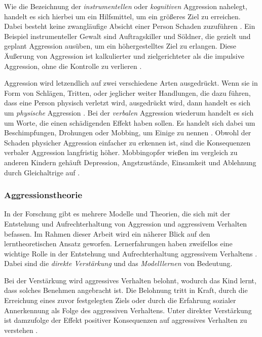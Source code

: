Wie die Bezeichnung der \textit{instrumentellen} oder \textit{kognitiven} Aggression nahelegt, handelt es sich hierbei um ein Hilfsmittel, um ein größeres Ziel zu erreichen. Dabei besteht keine zwangläufige Absicht einer Person Schaden zuzuführen \parencite{instrumental_aggro, instrumental_dictionary}.
Ein Beispiel instrumenteller Gewalt sind Auftragskiller und Söldner, die gezielt und geplant Aggression ausüben, um ein höhergestelltes Ziel zu erlangen. Diese Äußerung von Aggression ist kalkulierter und zielgerichteter als die impulsive Aggression, ohne die Kontrolle zu verlieren \parencite{impulsive_instrumental_aggro_healtline}.

Aggression wird letzendlich auf zwei verschiedene Arten ausgedrückt. Wenn sie in Form von Schlägen, Tritten, oder jeglicher weiter Handlungen, die dazu führen, dass eine Person physisch verletzt wird, ausgedrückt wird, dann handelt es sich um \textit{physische} Aggression \parencite{impulsive_instrumental_aggro_healtline, physische_verbale_aggro, physische_verbale_aggro_2}. Bei der \textit{verbalen} Aggression wiederum handelt es sich um Worte, die einen schädigenden Effekt haben sollen. Es handelt sich dabei um Beschimpfungen, Drohungen oder Mobbing, um Einige zu nennen \parencite{physische_verbale_aggro, physische_verbale_aggro_2, impulsive_instrumental_aggro_healtline}. Obwohl der Schaden physicher Aggression einfacher zu erkennen ist, sind die Konsequenzen verbaler Aggression langfristig höher. Mobbingopfer wießen im vergleich zu anderen Kindern gehäuft Depression, Angstzustände, Einsamkeit und Ablehnung durch Gleichaltrige auf \parencite{ausmaß_verbale_aggro}.



\subsubsection{Aggressionstheorie}    \label{subsubsec_2.1.3.2}
In der Forschung gibt es mehrere Modelle und Theorien, die sich  mit der Entstehung und Aufrechterhaltung von Aggression und aggressivem Verhalten befassen. Im Rahmen dieser Arbeit wird ein näherer Blick auf den lerntheoretischen Ansatz geworfen. Lernerfahrungen haben zweifellos eine wichtige Rolle in der Entstehung und Aufrechterhaltung aggressivem Verhaltens \parencite{Aggro_Theorie}. Dabei sind die \textit{direkte Verstärkung} und das \textit{Modelllernen} von Bedeutung. 

Bei der Verstärkung wird aggressives Verhalten belohnt, wodurch das Kind lernt, dass solches Benehmen angebracht ist. Die Belohnung tritt in Kraft, durch die Erreichung eines zuvor festgelegten Ziels oder durch die Erfahrung sozialer Annerkennung als Folge des aggressiven Verhaltens. Unter direkter Verstärkung ist damzufolge der Effekt positiver Konsequenzen auf aggressives Verhalten zu verstehen \parencite{Aggro_Theorie_Buch}.

